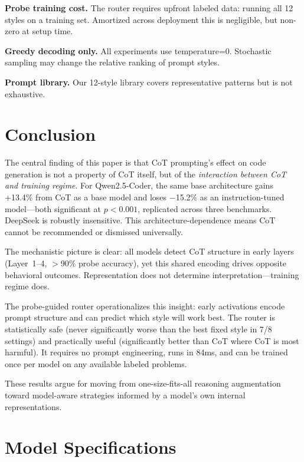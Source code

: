 \documentclass[11pt]{article}
\begin{document}
\textbf{Probe training cost.} The router requires upfront labeled data: running all 12 styles on a training set. Amortized across deployment this is negligible, but non-zero at setup time.

\textbf{Greedy decoding only.} All experiments use temperature=0. Stochastic sampling may change the relative ranking of prompt styles.

\textbf{Prompt library.} Our 12-style library covers representative patterns but is not exhaustive.

\section{Conclusion}

The central finding of this paper is that CoT prompting's effect on code generation is not a property of CoT itself, but of the \emph{interaction between CoT and training regime}. For Qwen2.5-Coder, the same base architecture gains +13.4\% from CoT as a base model and loses $-$15.2\% as an instruction-tuned model---both significant at $p{<}0.001$, replicated across three benchmarks. DeepSeek is robustly insensitive. This architecture-dependence means CoT cannot be recommended or dismissed universally.

The mechanistic picture is clear: all models detect CoT structure in early layers (Layer~1--4, $>$90\% probe accuracy), yet this shared encoding drives opposite behavioral outcomes. Representation does not determine interpretation---training regime does.

The probe-guided router operationalizes this insight: early activations encode prompt structure and can predict which style will work best. The router is statistically safe (never significantly worse than the best fixed style in 7/8 settings) and practically useful (significantly better than CoT where CoT is most harmful). It requires no prompt engineering, runs in 84ms, and can be trained once per model on any available labeled problems.

These results argue for moving from one-size-fits-all reasoning augmentation toward model-aware strategies informed by a model's own internal representations.



\appendix

\section{Model Specifications}
\label{app:models}
\end{document}
